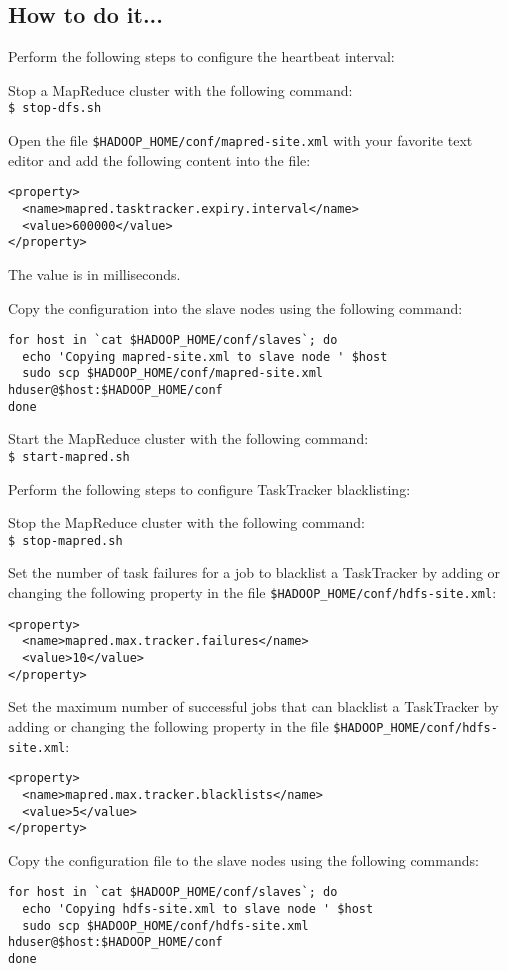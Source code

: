 \subsection*{How to do it...}
Perform the following steps to configure the heartbeat interval: 

Stop a MapReduce cluster with the following command:\\
\verb|$ stop-dfs.sh|

Open the file \verb|$HADOOP_HOME/conf/mapred-site.xml| with your favorite text editor and add the following content into the file:
\begin{verbatim} 
<property>
  <name>mapred.tasktracker.expiry.interval</name>
  <value>600000</value>
</property>
\end{verbatim}

The value is in milliseconds.

Copy the configuration into the slave nodes using the following command:
\begin{verbatim} 
for host in `cat $HADOOP_HOME/conf/slaves`; do
  echo 'Copying mapred-site.xml to slave node ' $host
  sudo scp $HADOOP_HOME/conf/mapred-site.xml hduser@$host:$HADOOP_HOME/conf
done
\end{verbatim}

Start the MapReduce cluster with the following command: \\
\verb|$ start-mapred.sh|

Perform the following steps to configure TaskTracker blacklisting:

Stop the MapReduce cluster with the following command: \\
\verb|$ stop-mapred.sh|

Set the number of task failures for a job to blacklist a TaskTracker by adding or changing the following property in the file \verb|$HADOOP_HOME/conf/hdfs-site.xml|:
\begin{verbatim} 
<property>
  <name>mapred.max.tracker.failures</name>
  <value>10</value>
</property>
\end{verbatim}

Set the maximum number of successful jobs that can blacklist a TaskTracker by adding or changing the following property in the file \verb|$HADOOP_HOME/conf/hdfs-site.xml|:
\begin{verbatim} 
<property>
  <name>mapred.max.tracker.blacklists</name>
  <value>5</value>
</property>
\end{verbatim}

Copy the configuration file to the slave nodes using the following commands:
\begin{verbatim} 
for host in `cat $HADOOP_HOME/conf/slaves`; do
  echo 'Copying hdfs-site.xml to slave node ' $host
  sudo scp $HADOOP_HOME/conf/hdfs-site.xml hduser@$host:$HADOOP_HOME/conf
done
\end{verbatim}

